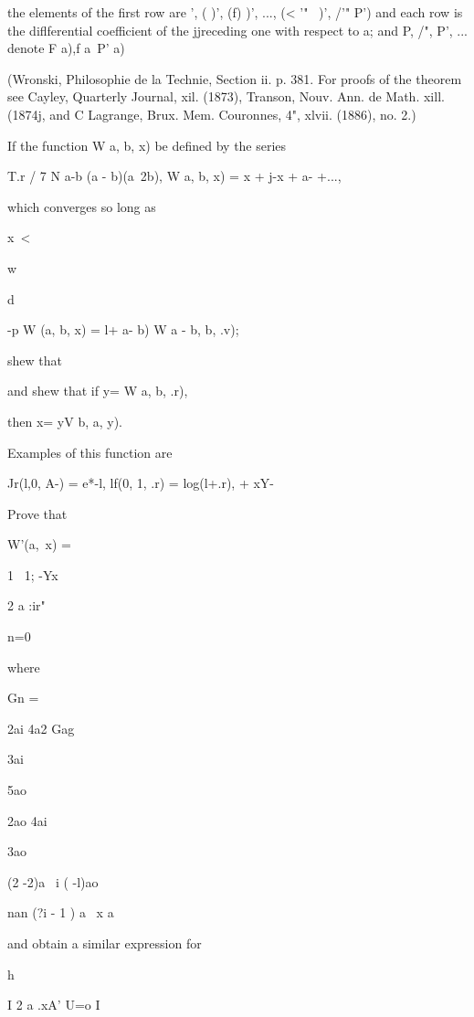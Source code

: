 \begin{wandwmiscexamples}
\begin{wandwmiscexample}
    the elements of the first row are ', ( )', (f) )', ..., (< '"~ )', /'"
    P') and each row is the diflferential coefficient of the jjreceding
    one with respect to a; and P, /", P', ... denote F a),f a\ P' a)

    (Wronski, Philosophie de la Technie, Section ii. p. 381. For proofs of
    the theorem see Cayley, Quarterly Journal, xil. (1873), Transon, Nouv.
    Ann. de Math. xill. (1874j, and C Lagrange, Brux. Mem. Couronnes, 4",
    xlvii. (1886), no. 2.)
  \end{wandwmiscexample}
  \begin{wandwmiscexample}
    If the function W a, b, x) be defined by the series

    T.r / 7 N a-b (a - b)(a~2b), W a, b, x) = x + j-x + a- +...,

    which converges so long as

    x\ <

    w

    d

    -p W (a, b, x) = l+ a- b) W a - b, b, .v);

    shew that

    and shew that if y= W a, b, .r),

    then x= yV b, a, y).

    Examples of this function are

    Jr(l,0, A-) = e*-l, lf(0, 1, .r) = log(l+.r), + xY-\
  \end{wandwmiscexample}
  \begin{wandwmiscexample}
    Prove that

    W'(a, \,x) =

    1 \ 1; -Yx


    2 a :ir"

    n=0

    where

    Gn =

    2ai 4a2 Gag

    3ai

    5ao

    2ao 4ai

    3ao

    (2 -2)a \ i ( -l)ao

    nan (?i - 1 ) a \ x a

    and obtain a similar expression for

    h

    I 2 a .xA' U=o I


\end{wandwmiscexample}
\end{wandwmiscexamples}
